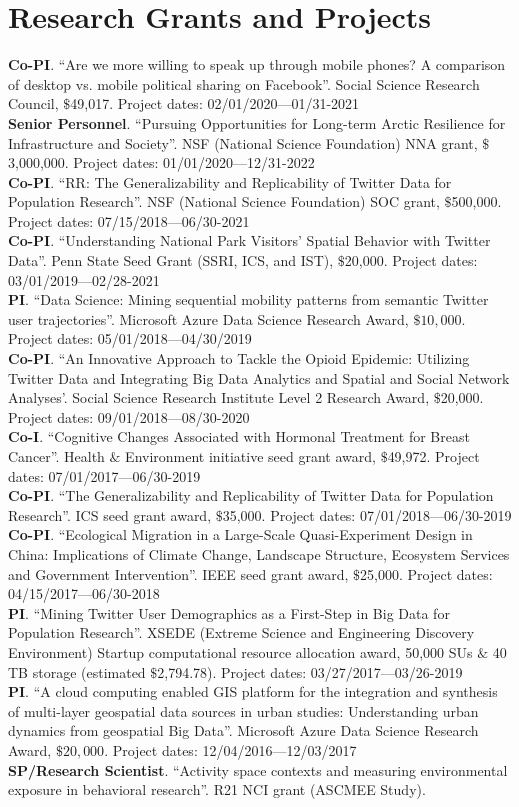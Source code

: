 \documentclass[11pt, a4paper]{article}
\begin{document}
\section*{Research Grants and Projects}
\textbf{Co-PI}. ``Are we more willing to speak up through mobile phones?  A comparison of desktop vs. mobile political sharing on Facebook''. Social Science Research Council, $\$$49,017. Project dates: 02/01/2020—01/31-2021\\
\textbf{Senior Personnel}. ``Pursuing Opportunities for Long-term Arctic Resilience for Infrastructure and Society''. NSF (National Science Foundation) NNA grant, $\$$3,000,000. Project dates: 01/01/2020—12/31-2022\\
\textbf{Co-PI}. ``RR: The Generalizability and Replicability of Twitter Data for Population Research''. NSF (National Science Foundation) SOC grant, $\$$500,000. Project dates: 07/15/2018—06/30-2021\\
\textbf{Co-PI}. ``Understanding National Park Visitors’ Spatial Behavior with Twitter Data''. Penn State Seed Grant (SSRI, ICS, and IST), $\$$20,000. Project dates: 03/01/2019—02/28-2021\\
\textbf{PI}. ``Data Science: Mining sequential mobility patterns from semantic Twitter user trajectories''. Microsoft Azure Data Science Research Award, $\$10,000$. Project dates: 05/01/2018—04/30/2019\\
\textbf{Co-PI}. ``An Innovative Approach to Tackle the Opioid Epidemic: Utilizing Twitter Data and Integrating Big Data Analytics and Spatial and Social Network Analyses'. Social Science Research Institute Level 2 Research Award, $\$$20,000. Project dates: 09/01/2018—08/30-2020\\
\textbf{Co-I}. ``Cognitive Changes Associated with Hormonal Treatment for Breast Cancer''. Health $\&$ Environment initiative seed grant award, $\$$49,972. Project dates: 07/01/2017—06/30-2019\\
\textbf{Co-PI}. ``The Generalizability and Replicability of Twitter Data for Population Research''. ICS seed grant award, $\$$35,000. Project dates: 07/01/2018—06/30-2019\\
\textbf{Co-PI}. ``Ecological Migration in a Large-Scale Quasi-Experiment Design in China: Implications of Climate Change, Landscape Structure, Ecosystem Services and Government Intervention''. IEEE seed grant award, $\$$25,000. Project dates: 04/15/2017—06/30-2018\\
\textbf{PI}. ``Mining Twitter User Demographics as a First-Step in Big Data for Population Research''. XSEDE (Extreme Science and Engineering Discovery Environment) Startup computational resource allocation award, 50,000 SUs $\&$ 40 TB storage (estimated $\$$2,794.78). Project dates: 03/27/2017—03/26-2019\\
\textbf{PI}. ``A cloud computing enabled GIS platform for the integration and synthesis of multi-layer geospatial data sources in urban studies: Understanding urban dynamics from geospatial Big Data''. Microsoft Azure Data Science Research Award, $\$20,000$. Project dates: 12/04/2016—12/03/2017\\
\textbf{SP/Research Scientist}. ``Activity space contexts and measuring environmental exposure in behavioral research''. R21 NCI grant (ASCMEE Study).
\end{document}
